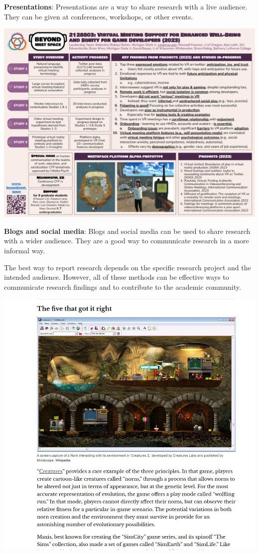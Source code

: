 \documentclass[
]{book}
\begin{document}
\textbf{Presentations}: Presentations are a way to share research with a live audience. They can be given at conferences, workshops, or other events.

\includegraphics[width=1\linewidth,height=\textheight,keepaspectratio]{images/BMS2023poster.jpg}

\textbf{Blogs and social media}: Blogs and social media can be used to share research with a wider audience. They are a good way to communicate research in a more informal way.

The best way to report research depends on the specific research project and the intended audience. However, all of these methods can be effective ways to communicate research findings and to contribute to the academic community.

\includegraphics[width=1\linewidth,height=\textheight,keepaspectratio]{images/fig091.jpg}
\end{document}
